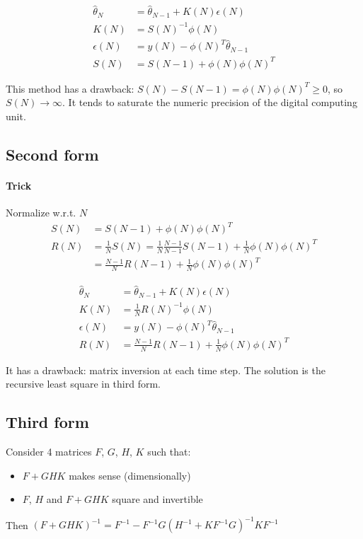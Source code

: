 \begin{align*}
    \hat{\theta}_N &= \hat{\theta}_{N-1} + K(N)\epsilon(N) \\
    K(N) &= S(N)^{-1}\phi(N) \\
    \epsilon(N) &= y(N) - \phi(N)^T\hat{\theta}_{N-1} \\
    S(N) &= S(N-1) + \phi(N)\phi(N)^T
\end{align*}

This method has a drawback: $S(N) - S(N-1) = \phi(N)\phi(N)^T \ge 0$, so $S(N) \rightarrow \infty$.
It tends to saturate the numeric precision of the digital computing unit.

\subsection{Second form}

\paragraph{Trick} Normalize w.r.t. $N$
\begin{align*}
    S(N) &= S(N-1) + \phi(N)\phi(N)^T \\
    R(N) &= \frac{1}{N} S(N) = \frac{1}{N} \frac{N-1}{N-1} S(N-1) + \frac{1}{N} \phi(N)\phi(N)^T \\
    &= \frac{N-1}{N}R(N-1) + \frac{1}{N}\phi(N)\phi(N)^T
\end{align*}

\begin{align*}
    \hat{\theta}_N &= \hat{\theta}_{N-1} + K(N)\epsilon(N) \\
    K(N) &= \frac{1}{N}R(N)^{-1}\phi(N) \\
    \epsilon(N) &= y(N) - \phi(N)^T\hat{\theta}_{N-1} \\
    R(N) &= \frac{N-1}{N}R(N-1) + \frac{1}{N}\phi(N)\phi(N)^T
\end{align*}

It has a drawback: matrix inversion at each time step.
The solution is the recursive least square in third form.

\subsection{Third form}

\begin{lemma}
    Consider 4 matrices $F$, $G$, $H$, $K$ such that:
    \begin{itemize}
        \item $F+GHK$ makes sense (dimensionally)
        \item $F$, $H$ and $F+GHK$ square and invertible
    \end{itemize}
    Then $(F+GHK)^{-1} = F^{-1} - F^{-1}G(H^{-1} + KF^{-1}G)^{-1}KF^{-1}$
\end{lemma}

